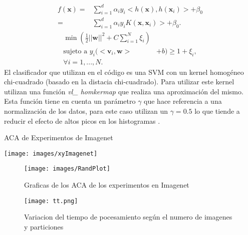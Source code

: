 \documentclass[10pt,twocolumn,letterpaper]{article}
\begin{document}
\begin{equation} \label{eq:SVM}
\begin{split}
f(\textbf{x}) = &\sum_{i=1}^{d}\alpha _i y_i <h(\textbf{x}),h(\textbf{x}_i)> + \beta _0 \\
= &\sum_{i=1}^{d}\alpha _i y_i K(\textbf{x},\textbf{x}_i)> + \beta _0.
\end{split}
\end{equation}
\begin{equation} \label{eq:probSVM}
\begin{split}
\min \left( \frac{1}{2}||\textbf{w}||^2 +C \sum_{i=1}^N \xi _i \right) \\
\text{sujeto a   } y_i(<\textbf{v}_i,\textbf{w}> &+ b) \geq 1+\xi _i, \\
\forall i =1,...,N.
\end{split}
\end{equation}
El clasificador que utilizan en el código es una SVM con un kernel homogéneo chi-cuadrado (basado en la distacia chi-cuadrado). Para utilizar este kernel utilizan una función \textit{vl\_ homkermap} que realiza una aproximación del mismo. Esta función tiene en cuenta un parámetro  $\gamma$ que hace referencia a una normalización de los datos, para este caso utilizan un $\gamma=0.5$ lo que tiende a reducir el efecto de altos picos en los histogramas \cite{vedaldi2012efficient}.

\onecolumn
\begin{table}[t]
\caption{ACA de Experimentos de Imagenet}
\texttt{[image: images/xyImagenet]}
\label{tab:Imagenetexp}
\end{table}
\begin{figure}[t]
\texttt{[image: images/RandPlot]}
\caption{Graficas de los ACA de los experimentos en Imagenet}
\label{gr:Imagenetexp}
\end{figure}
\begin{figure}[t]
\texttt{[image: tt.png]}
\caption{Variacion del tiempo de pocesamiento según el numero de imagenes y particiones}
\label{gr:tt}
\end{figure}

\twocolumn
\end{document}

